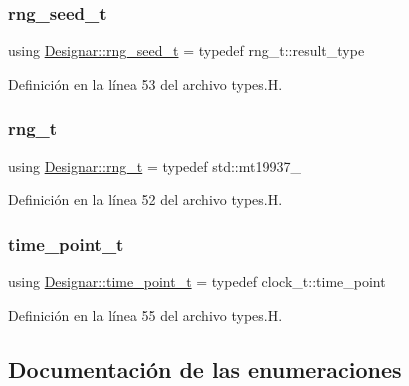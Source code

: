 \mbox{\label{namespace_designar_ad621b5646d45288c5d6a1e1dfe7531a8}} 
\subsubsection{\texorpdfstring{rng\+\_\+seed\+\_\+t}{rng\_seed\_t}}
{\footnotesize\ttfamily using \hyperlink{namespace_designar_ad621b5646d45288c5d6a1e1dfe7531a8}{Designar\+::rng\+\_\+seed\+\_\+t} = typedef rng\+\_\+t\+::result\+\_\+type}



Definición en la línea 53 del archivo types.\+H.

\mbox{\label{namespace_designar_a9ca84e2ff5daa62ebc4dab52f3a6c855}} 
\subsubsection{\texorpdfstring{rng\+\_\+t}{rng\_t}}
{\footnotesize\ttfamily using \hyperlink{namespace_designar_a9ca84e2ff5daa62ebc4dab52f3a6c855}{Designar\+::rng\+\_\+t} = typedef std\+::mt19937\+\_}



Definición en la línea 52 del archivo types.\+H.

\mbox{\label{namespace_designar_a0edbd598eadb672df2c70e5af4dfccee}} 
\subsubsection{\texorpdfstring{time\+\_\+point\+\_\+t}{time\_point\_t}}
{\footnotesize\ttfamily using \hyperlink{namespace_designar_a0edbd598eadb672df2c70e5af4dfccee}{Designar\+::time\+\_\+point\+\_\+t} = typedef clock\+\_\+t\+::time\+\_\+point}



Definición en la línea 55 del archivo types.\+H.



\subsection{Documentación de las enumeraciones}
\mbox{\label{namespace_designar_a679bc99fd69a3601faa5d6d47f865106}} 

